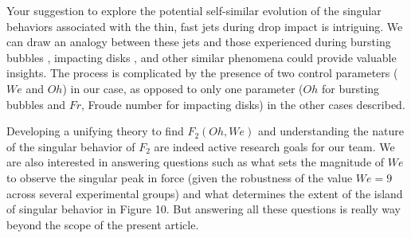 \documentclass[]{article}
\begin{document}
\begin{enumerate}
\begin{enumerate}
		Your suggestion to explore the potential self-similar evolution of the singular behaviors associated with the thin, fast jets during drop impact is intriguing. We can draw an analogy between these jets and those experienced during bursting bubbles \citep{sanjay_lohse_jalaal_2021}, impacting disks \citep{bergmann2009controlled}, and other similar phenomena could provide valuable insights. The process is complicated by the presence of two control parameters ($We$ and $Oh$) in our case, as opposed to only one parameter ($Oh$ for bursting bubbles and $Fr$, Froude number for impacting disks) in the other cases described.
		
		Developing a unifying theory to find $F_2(Oh, We)$ and understanding the nature of the singular behavior of $F_2$ are indeed active research goals for our team. We are also interested in answering questions such as what sets the magnitude of $We$ to observe the singular peak in force (given the robustness of the value $We = 9$ across several experimental groups) and what determines the extent of the island of singular behavior in Figure 10. But answering all these questions is really way beyond the scope of the present article. 		
	\end{enumerate}
\end{enumerate}

\printbibliography[title=References]
\end{document}
